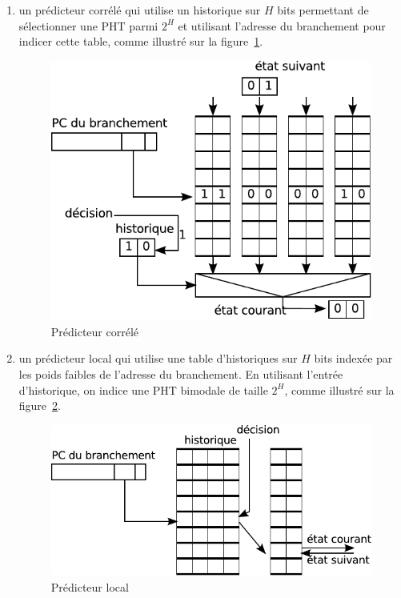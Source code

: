 \documentclass[a4paper]{article}
\begin{document}
\begin{enumerate}
\item un prédicteur corrélé qui utilise un historique sur $H$ bits permettant de sélectionner une PHT parmi $2^H$ et utilisant l'adresse du branchement pour indicer cette table, comme illustré sur la figure~\ref{correlated}.
      \begin{figure}[hbt]\center\leavevmode
      \includegraphics[scale=.9]{correlated}
      \caption{\label{correlated}Prédicteur corrélé}
      \end{figure}

\item un prédicteur local qui utilise une table d'historiques sur $H$ bits indexée par les poids faibles de l'adresse du branchement.  En utilisant l'entrée d'historique, on indice une PHT bimodale de taille $2^H$, comme illustré sur la figure~\ref{local}.
      \begin{figure}[hbt]\center\leavevmode
      \includegraphics[scale=.9]{local}
      \caption{Prédicteur local}
      \label{local}
      \end{figure}


\end{enumerate}
\end{document}
